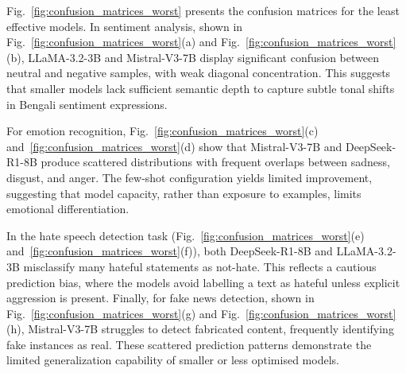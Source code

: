 \documentclass[10pt,letterpaper]{article}
\begin{document}
Fig.~\ref{fig:confusion_matrices_worst} presents the confusion matrices for the least effective models. In sentiment analysis, shown in Fig.~\ref{fig:confusion_matrices_worst}(a) and Fig.~\ref{fig:confusion_matrices_worst}(b), LLaMA-3.2-3B and Mistral-V3-7B display significant confusion between neutral and negative samples, with weak diagonal concentration. This suggests that smaller models lack sufficient semantic depth to capture subtle tonal shifts in Bengali sentiment expressions.

For emotion recognition, Fig.~\ref{fig:confusion_matrices_worst}(c) and~\ref{fig:confusion_matrices_worst}(d) show that Mistral-V3-7B and DeepSeek-R1-8B produce scattered distributions with frequent overlaps between sadness, disgust, and anger. The few-shot configuration yields limited improvement, suggesting that model capacity, rather than exposure to examples, limits emotional differentiation.

In the hate speech detection task (Fig.~\ref{fig:confusion_matrices_worst}(e) and~\ref{fig:confusion_matrices_worst}(f)), both DeepSeek-R1-8B and LLaMA-3.2-3B misclassify many hateful statements as not-hate. This reflects a cautious prediction bias, where the models avoid labelling a text as hateful unless explicit aggression is present. Finally, for fake news detection, shown in Fig.~\ref{fig:confusion_matrices_worst}(g) and Fig.~\ref{fig:confusion_matrices_worst}(h), Mistral-V3-7B struggles to detect fabricated content, frequently identifying fake instances as real. These scattered prediction patterns demonstrate the limited generalization capability of smaller or less optimised models.
\end{document}
